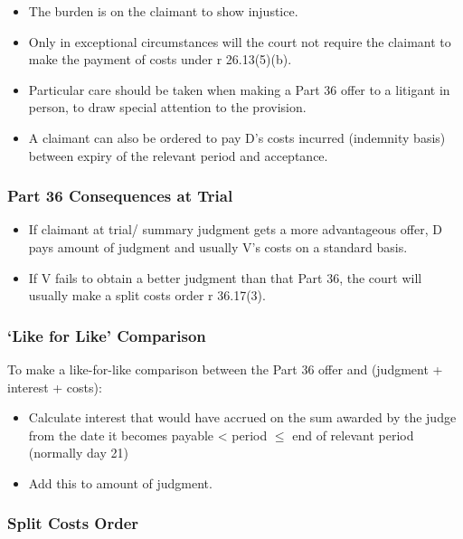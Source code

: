 \documentclass[
]{article}
\providecommand{\tightlist}{%
  \setlength{\itemsep}{0pt}\setlength{\parskip}{0pt}}
\begin{document}
\begin{itemize}
\tightlist
\item
  The burden is on the claimant to show injustice.
\item
  Only in exceptional circumstances will the court not require the
  claimant to make the payment of costs under r 26.13(5)(b).
\item
  Particular care should be taken when making a Part 36 offer to a
  litigant in person, to draw special attention to the provision.
\item
  A claimant can also be ordered to pay D's costs incurred (indemnity
  basis) between expiry of the relevant period and acceptance.
\end{itemize}

\hypertarget{part-36-consequences-at-trial}{%
\subsubsection{Part 36 Consequences at
Trial}\label{part-36-consequences-at-trial}}

\begin{itemize}
\tightlist
\item
  If claimant at trial/ summary judgment gets a more advantageous offer,
  D pays amount of judgment and usually V's costs on a standard basis.
\item
  If V fails to obtain a better judgment than that Part 36, the court
  will usually make a split costs order r 36.17(3).
\end{itemize}

\hypertarget{like-for-like-comparison}{%
\subsubsection{`Like for Like'
Comparison}\label{like-for-like-comparison}}

To make a like-for-like comparison between the Part 36 offer and
(judgment + interest + costs):

\begin{itemize}
\tightlist
\item
  Calculate interest that would have accrued on the sum awarded by the
  judge from the date it becomes payable \textless{} period \(\leq\) end
  of relevant period (normally day 21)
\item
  Add this to amount of judgment.
\end{itemize}

\hypertarget{split-costs-order}{%
\subsubsection{Split Costs Order}\label{split-costs-order}}
\end{document}
